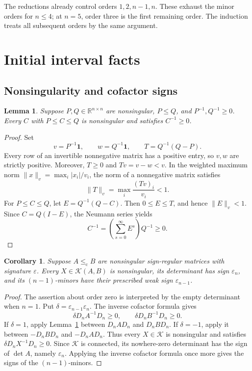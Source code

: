 \documentclass[11pt]{article}
\newtheorem{lemma}[theorem]{Lemma}
\newtheorem{corollary}[theorem]{Corollary}
\theoremstyle{definition}
\theoremstyle{remark}
\numberwithin{equation}{section}
\newcommand{\R}{\mathbb R}
\newcommand{\eps}{\varepsilon}
\newcommand{\K}{\mathcal K}
\newcommand{\chle}{\leq_{\mathrm c}}
\newcommand{\one}{\mathbf 1}
\begin{document}
The reductions already control orders $1,2,n-1,n$. These exhaust the
minor orders for $n\leq4$; at $n=5$, order three is the first remaining
order. The induction treats all subsequent orders by the same argument.

\section{Initial interval facts}\label{sec:initial}

\subsection{Nonsingularity and cofactor signs}

\begin{lemma}\label{lem:inverse}
Suppose $P,Q\in\R^{n\times n}$ are nonsingular, $P\leq Q$, and
$P^{-1},Q^{-1}\geq0$. Every $C$ with $P\leq C\leq Q$ is
nonsingular and satisfies $C^{-1}\geq0$.
\end{lemma}

\begin{proof}
Set
\[
 v=P^{-1}\one,\qquad w=Q^{-1}\one,\qquad T=Q^{-1}(Q-P).
\]
Every row of an invertible nonnegative matrix has a positive entry,
so $v,w$ are strictly positive. Moreover, $T\geq0$ and
$Tv=v-w<v$. In the weighted maximum norm
$\|x\|_v=\max_i|x_i|/v_i$, the norm of a nonnegative matrix satisfies
\[
 \|T\|_v=\max_i\frac{(Tv)_i}{v_i}<1.
\]
For $P\leq C\leq Q$, let $E=Q^{-1}(Q-C)$. Then
$0\leq E\leq T$, and hence $\|E\|_v<1$. Since $C=Q(I-E)$,
the Neumann series yields
\[
 C^{-1}=\left(\sum_{s=0}^{\infty}E^s\right)Q^{-1}\geq0.
\]
\end{proof}

\begin{corollary}\label{cor:nonsingular}
Suppose $A\chle B$ are nonsingular sign-regular matrices with
signature $\eps$. Every $X\in\K(A,B)$ is nonsingular, its determinant
has sign $\eps_n$, and its $(n-1)$-minors have their prescribed weak
sign $\eps_{n-1}$.
\end{corollary}

\begin{proof}
The assertion about order zero is interpreted by the empty determinant
when $n=1$. Put $\delta=\eps_{n-1}\eps_n$. The inverse cofactor formula
gives
\[
 \delta D_nA^{-1}D_n\geq0,\qquad
 \delta D_nB^{-1}D_n\geq0.
\]
If $\delta=1$, apply Lemma~\ref{lem:inverse} between $D_nAD_n$ and
$D_nBD_n$. If $\delta=-1$, apply it between $-D_nBD_n$ and
$-D_nAD_n$. Thus every $X\in\K$ is nonsingular and satisfies
$\delta D_nX^{-1}D_n\geq0$. Since $\K$ is connected, its nowhere-zero
determinant has the sign of $\det A$, namely $\eps_n$.
Applying the inverse cofactor formula once more gives the signs of the
$(n-1)$-minors.
\end{proof}
\end{document}

